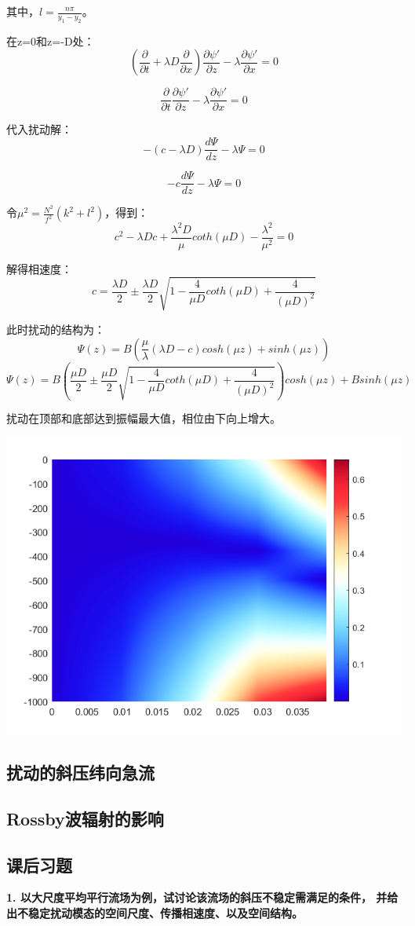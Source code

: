\documentclass{article}
\begin{document}
其中，$l = \frac{n\pi}{y_1 - y_2}$。

在z=0和z=-D处：
$$(\frac{\partial }{\partial t}
+\lambda D\frac{\partial}{\partial x})
\frac{\partial \psi'}{\partial z}
- \lambda\frac{\partial \psi'}{\partial x}
=0$$

$$\frac{\partial }{\partial t}
\frac{\partial \psi'}{\partial z}
- \lambda\frac{\partial \psi'}{\partial x}
=0$$

代入扰动解：
$$-(c-\lambda D)
\frac{d\Psi}{dz}
- \lambda\Psi
=0$$

$$-c\frac{d\Psi}{dz}
- \lambda\Psi
=0$$

令$\mu^2 = \frac{N^2}{f^2}(k^2+l^2)$，得到：
$$c^2 - \lambda Dc +\frac{\lambda^2D}{\mu}coth(\mu D) 
-\frac{\lambda^2}{\mu^2} = 0$$

解得相速度：
$$c = \frac{\lambda D}{2} \pm \frac{\lambda D}{2}
\sqrt{1-\frac{4}{\mu D}coth(\mu D) + \frac{4}{(\mu D)^2}}$$

此时扰动的结构为：
$$\Psi(z) = B(\frac{\mu}{\lambda}(\lambda D-c)cosh(\mu z) + sinh(\mu z))$$
$$\Psi(z) = B\left(\frac{\mu D}{2} 
\pm \frac{\mu D}{2}
\sqrt{1-\frac{4}{\mu D}coth(\mu D) + \frac{4}{(\mu D)^2}}\right)
cosh(\mu z) + Bsinh(\mu z)$$

扰动在顶部和底部达到振幅最大值，相位由下向上增大。
\begin{center}
    \includegraphics[width=0.6\linewidth]{Fig5_5.png}
\end{center}


\subsection{扰动的斜压纬向急流}
\subsection{Rossby波辐射的影响}
\subsection{课后习题}
\textbf{1. 以大尺度平均平行流场为例，试讨论该流场的斜压不稳定需满足的条件，
并给出不稳定扰动模态的空间尺度、传播相速度、以及空间结构。}
\end{document}
